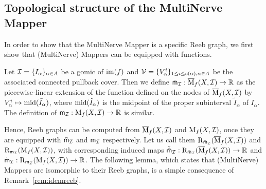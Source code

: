 \subsection{Topological structure of the MultiNerve Mapper}
\label{sec:topoMultiNerve}



In order to show that the MultiNerve Mapper is a specific Reeb graph, 
we first show that (MultiNerve) Mappers can be equipped with functions. %

\begin{defin}\label{def:arbitfunc}
Let $\mathcal{I}=\{I_\alpha\}_{\alpha\in A}$ be a gomic of $\mathrm{im}(f)$ and 
$\mathcal{V}=\{V^i_\alpha\}_{\substack{1\leq i \leq c(\alpha), \alpha\in A}}$ be the associated
connected pullback cover. 
Then we define $\bar {\sf{m}}_{\mathcal I}:\overline{\mathrm{M}}_f(X,\mathcal{I})\rightarrow\mathbb{R}$ 
as the piecewise-linear extension of the function defined
on the nodes of $\overline{\mathrm{M}}_f(X,\mathcal{I})$ by
$V_\alpha^i\mapsto{\rm mid}(\tilde I_\alpha)$,
where ${\rm mid}(\tilde I_\alpha)$ is the midpoint of the proper subinterval $\tilde I_\alpha$ of $I_\alpha$.
The definition of ${\sf m}_{\mathcal I}:\mathrm{M}_f(X,\mathcal{I})\rightarrow\mathbb{R}$ is similar. 
\end{defin}

Hence, Reeb graphs can be computed from $\overline{\mathrm{M}}_f(X,\mathcal{I})$ and $\mathrm{M}_f(X,\mathcal{I})$, once they are equipped with $\bar {\sf{m}}_{\mathcal I}$ and ${\sf m}_{\mathcal I}$ respectively.
Let us call them $\mathrm{R}_{\bar {\sf{m}}_{\mathcal I}}(\overline{\mathrm{M}}_f(X,\mathcal{I}))$ and $\mathrm{R}_{{\sf m}_{\mathcal I}}(\mathrm{M}_f(X,\mathcal{I}))$,
with corresponding induced maps 
${\tilde{\bar{\sf{m}}}_{\mathcal I}}:\mathrm{R}_{\bar {\sf{m}}_{\mathcal I}}(\overline{\mathrm{M}}_f(X,\mathcal{I}))\rightarrow\mathbb{R}$ and $\tilde{\sf{m}}_{\mathcal I}:\mathrm{R}_{{\sf m}_{\mathcal I}}(\mathrm{M}_f(X,\mathcal{I}))\rightarrow\mathbb{R}$.
The following lemma, which states that (MultiNerve) Mappers are isomorphic to their Reeb graphs, is a simple consequence of Remark~\ref{rem:idemreeb}.

